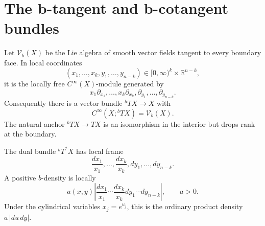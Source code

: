 \documentclass[12pt,oneside,reqno]{article}
\theoremstyle{plain}
\theoremstyle{definition}
\theoremstyle{remark}
\begin{document}
\section{The b-tangent and b-cotangent bundles}

Let $\mathcal V_b(X)$ be the Lie algebra of smooth vector fields tangent
to every boundary face. In local coordinates
\[
 (x_1,\ldots,x_k,y_1,\ldots,y_{n-k})
 \in[0,\infty)^k\times\mathbb R^{n-k},
\]
it is the locally free $C^\infty(X)$-module generated by
\[
 x_1\partial_{x_1},\ldots,x_k\partial_{x_k},
 \partial_{y_1},\ldots,\partial_{y_{n-k}}.
\]
Consequently there is a vector bundle \({}^bTX\to X\) with
\[
 C^\infty(X;{}^bTX)=\mathcal V_b(X).
\]
The natural anchor \({}^bTX\to TX\) is an isomorphism in the interior
but drops rank at the boundary.

The dual bundle \({}^bT^*X\) has local frame
\[
 \frac{dx_1}{x_1},\ldots,\frac{dx_k}{x_k},
 dy_1,\ldots,dy_{n-k}.
\]
A positive $b$-density is locally
\[
 a(x,y)\left|
 \frac{dx_1}{x_1}\cdots\frac{dx_k}{x_k}
 dy_1\cdots dy_{n-k}\right|,
 \qquad a>0.
\]
Under the cylindrical variables $x_j=e^{u_j}$, this is the ordinary
product density $a\,|du\,dy|$.
\end{document}
